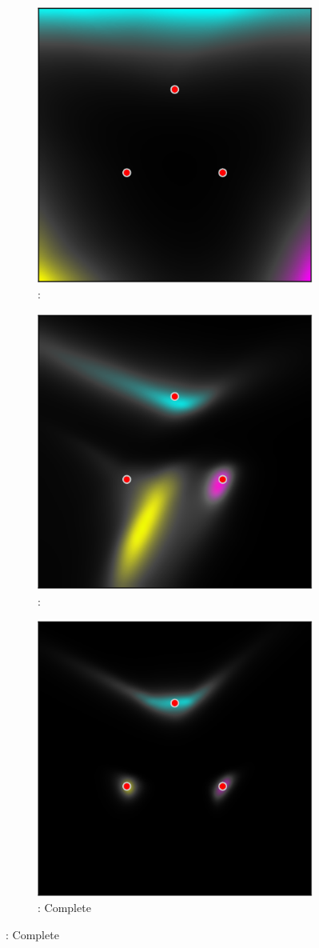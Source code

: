 \begin{figure}
    \centering
    \begin{subfigure}[t]{0.33 \textwidth}
        \centering
        \includegraphics[width=0.5 \textwidth]{sections/006_neurips2020/figures/three_gaussians_no_flow-crop.pdf}
        \caption{\PostNetacro: \NoFlow}
    \end{subfigure}%
    \begin{subfigure}[t]{0.33 \textwidth}
        \centering
        \includegraphics[width=0.5 \textwidth]{sections/006_neurips2020/figures/three_gaussians_no_UCE-crop.pdf}
        \caption{\PostNetacro: \NoUCE}
    \end{subfigure}%
    \begin{subfigure}[t]{0.33 \textwidth}
        \centering
        \includegraphics[width=0.5 \textwidth]{sections/006_neurips2020/figures/three_gaussians_normal-crop.pdf}
        \caption{\PostNetacro: Complete}
    \end{subfigure}%


\end{figure}
